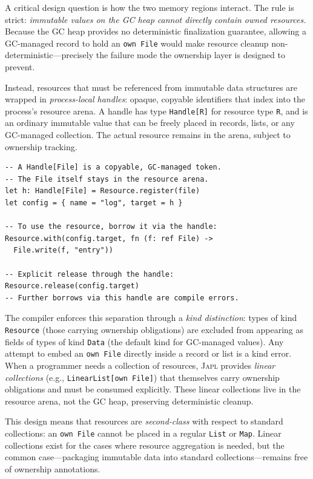 \documentclass[11pt,twocolumn]{article}
\newcommand{\japl}{\textsc{Japl}}
\begin{document}
A critical design question is how the two memory regions interact.
The rule is strict: \emph{immutable values on the GC heap cannot directly contain owned resources.}
Because the GC heap provides no deterministic finalization guarantee, allowing a GC-managed record to hold an \texttt{own File} would make resource cleanup non-deterministic---precisely the failure mode the ownership layer is designed to prevent.

Instead, resources that must be referenced from immutable data structures are wrapped in \emph{process-local handles}: opaque, copyable identifiers that index into the process's resource arena.
A handle has type \texttt{Handle[R]} for resource type \texttt{R}, and is an ordinary immutable value that can be freely placed in records, lists, or any GC-managed collection.
The actual resource remains in the arena, subject to ownership tracking.

\begin{lstlisting}
-- A Handle[File] is a copyable, GC-managed token.
-- The File itself stays in the resource arena.
let h: Handle[File] = Resource.register(file)
let config = { name = "log", target = h }

-- To use the resource, borrow it via the handle:
Resource.with(config.target, fn (f: ref File) ->
  File.write(f, "entry"))

-- Explicit release through the handle:
Resource.release(config.target)
-- Further borrows via this handle are compile errors.
\end{lstlisting}

The compiler enforces this separation through a \emph{kind distinction}: types of kind \texttt{Resource} (those carrying ownership obligations) are excluded from appearing as fields of types of kind \texttt{Data} (the default kind for GC-managed values).
Any attempt to embed an \texttt{own File} directly inside a record or list is a kind error.
When a programmer needs a collection of resources, \japl{} provides \emph{linear collections} (e.g., \texttt{LinearList[own File]}) that themselves carry ownership obligations and must be consumed explicitly.
These linear collections live in the resource arena, not the GC heap, preserving deterministic cleanup.

This design means that resources are \emph{second-class} with respect to standard collections: an \texttt{own File} cannot be placed in a regular \texttt{List} or \texttt{Map}.
Linear collections exist for the cases where resource aggregation is needed, but the common case---packaging immutable data into standard collections---remains free of ownership annotations.
\end{document}
